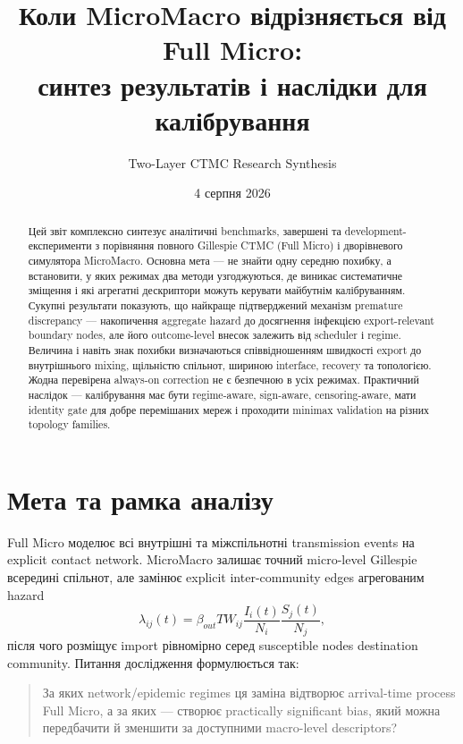 \documentclass[11pt,a4paper]{article}
\title{\textbf{Коли MicroMacro відрізняється від Full Micro:}\\
синтез результатів і наслідки для калібрування}
\author{Two-Layer CTMC Research Synthesis}
\date{4 серпня 2026}
\begin{document}
\maketitle

\begin{abstract}
Цей звіт комплексно синтезує аналітичні benchmarks, завершені та
development-експерименти з порівняння
повного Gillespie CTMC (Full Micro) і дворівневого симулятора MicroMacro.
Основна мета --- не знайти одну середню похибку, а встановити, у яких режимах
два методи узгоджуються, де виникає систематичне зміщення і які агрегатні
дескриптори можуть керувати майбутнім калібруванням. Сукупні результати
показують, що найкраще підтверджений механізм premature discrepancy ---
накопичення aggregate hazard до досягнення інфекцією export-relevant boundary
nodes, але його outcome-level внесок залежить від scheduler і regime.
Величина і навіть знак похибки визначаються співвідношенням швидкості export
до внутрішнього mixing, щільністю спільнот, шириною interface, recovery та
топологією. Жодна перевірена always-on correction не є безпечною в усіх
режимах. Практичний наслідок --- калібрування має бути regime-aware,
sign-aware, censoring-aware, мати identity gate для добре перемішаних мереж
і проходити minimax validation на різних topology families.
\end{abstract}

\tableofcontents
\clearpage

\section{Мета та рамка аналізу}

Full Micro моделює всі внутрішні та міжспільнотні transmission events на
explicit contact network. MicroMacro залишає точний micro-level Gillespie
всередині спільнот, але замінює explicit inter-community edges агрегованим
hazard
\[
 \lambda_{ij}(t)=\beta_{out}T W_{ij}
 \frac{I_i(t)}{N_i}\frac{S_j(t)}{N_j},
\]
після чого розміщує import рівномірно серед susceptible nodes destination
community. Питання дослідження формулюється так:

\begin{quote}
За яких network/epidemic regimes ця заміна відтворює arrival-time process
Full Micro, а за яких --- створює practically significant bias, який можна
передбачити й зменшити за доступними macro-level descriptors?
\end{quote}
\end{document}
